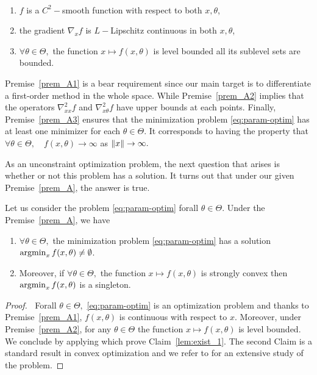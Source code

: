 \begin{premise}{\ }\label{prem_A}
\begin{enumerate}[label=(A.\arabic*)]
 \item \label{prem_A1} $f$ is a $C^2-$smooth  function with respect to both $x,\theta$,
 \item\label{prem_A2}  the gradient $\nabla_x f$ is $L-$Lipschitz continuous in both $x,\theta$, 
 \item \label{prem_A3}  $\forall\theta\in\Theta,$  the function  $x \mapsto f(x,\theta)$ is  level bounded \ie  all its sublevel sets are bounded. 
\end{enumerate}
\end{premise}
\begin{remark}
Premise~\ref{prem_A1} is a bear  requirement  since our main target is to differentiate a first-order method in the whole space. While Premise~\ref{prem_A2} implies that the operators $\nabla_{xx}^2f$ and $\nabla_{x\theta}^2f$  have upper bounds at each points. Finally, Premise~\ref{prem_A3} ensures that the minimization problem \eqref{eq:param-optim} has at least one minimizer for each $\theta\in\Theta$. It corresponds to having the property that $\forall \theta\in\Theta, \quad f(x,\theta)\to\infty$ as $\left\Vert {x} \right\Vert\to\infty.$ 
\end{remark}


As an unconstraint optimization problem, the next question that arises is whether or not this problem has a solution. It turns out that under our given Premise~\ref{prem_A}, the answer is true. 
\begin{lemma}[Existence]\label{lem:exist} Let us consider  the problem \eqref{eq:param-optim} forall $\theta\in\Theta.$ Under the Premise~\ref{prem_A}, we have
\begin{enumerate}
\item\label{lem:exist_1} $\forall\theta\in\Theta,$ the minimization problem \eqref{eq:param-optim}  has a solution \ie $\operatorname*{argmin}_x f(x,\theta)\neq\emptyset$. 
\item\label{lem:exist_2} Moreover,  if $\forall\theta\in\Theta,$ the function $x\mapsto f(x,\theta)$ is strongly convex then $\operatorname*{argmin}_x f(x,\theta)$ is a singleton. 
\end{enumerate}
\end{lemma} 
\begin{proof}$~$
 Forall $\theta\in\Theta,$ \eqref{eq:param-optim} is an optimization problem and thanks to Premise~\ref{prem_A1}, $f(x,\theta)$ is continuous with respect to $x$. Moreover, under Premise~\ref{prem_A2},  for any $\theta\in\Theta$ the function $x\mapsto f(x,\theta)$ is level bounded. We conclude by applying \cite[Theorem~1.6]{rockafellar_variational_1998} which prove Claim~\ref{lem:exist_1}.
 The second Claim is a standard result in convex optimization and we refer to \cite{rockafellar_convex_1970} for an extensive study of the problem.
\end{proof}






